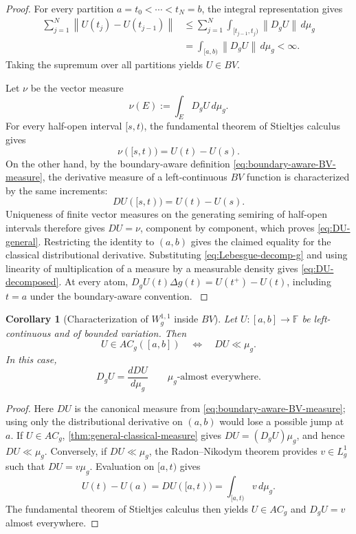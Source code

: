 \documentclass[preprint,12pt]{elsarticle}
\newenvironment{revision}{\begingroup\color{red}}{\endgroup}
\newenvironment{revision}{}{}
\newtheorem{corollary}[theorem]{Corollary}
\theoremstyle{definition}
\theoremstyle{remark}
\newcommand{\F}{\mathbb F}
\newcommand{\norm}[1]{\left\lVert#1\right\rVert}
\begin{document}
\begin{proof}
For every partition $a=t_0<\cdots<t_N=b$, the integral representation gives
\begin{align*}
 \sum_{j=1}^N\norm{U(t_j)-U(t_{j-1})}
 &\le\sum_{j=1}^N\int_{[t_{j-1},t_j)}\norm{D_gU}\,d\mu_g\\
 &=\int_{[a,b)}\norm{D_gU}\,d\mu_g<\infty.
\end{align*}
Taking the supremum over all partitions yields $U\in BV$.

Let $\nu$ be the vector measure
\[
 \nu(E):=\int_E D_gU\,d\mu_g.
\]
For every half-open interval $[s,t)$, the fundamental theorem of Stieltjes calculus gives
\[
 \nu([s,t))=U(t)-U(s).
\]
\begin{revision}
On the other hand, by the boundary-aware definition
\eqref{eq:boundary-aware-BV-measure}, the derivative measure of a
left-continuous \(BV\) function is characterized by the same increments:
\end{revision}
\[
 DU([s,t))=U(t)-U(s).
\]
\begin{revision}
Uniqueness of finite vector measures on the generating semiring of half-open
intervals therefore gives \(DU=\nu\), component by component, which proves
\eqref{eq:DU-general}.  Restricting the identity to \((a,b)\) gives the claimed
equality for the classical distributional derivative.  Substituting
\eqref{eq:Lebesgue-decomp-g} and using linearity of multiplication of a measure
by a measurable density gives \eqref{eq:DU-decomposed}. At every atom,
\(D_gU(t)\Delta g(t)=U(t^+)-U(t)\), including \(t=a\) under the
boundary-aware convention.
\end{revision}
\end{proof}

\begin{corollary}[Characterization of $W_g^{1,1}$ inside $BV$]\label{cor:BV-characterization}
Let $U:[a,b]\to\F$ be left-continuous and of bounded variation. Then
\[
 U\in AC_g([a,b])
 \quad\Longleftrightarrow\quad
 DU\ll\mu_g.
\]
In this case,
\[
 D_gU=\frac{dDU}{d\mu_g}
 \qquad\mu_g\text{-almost everywhere}.
\]
\end{corollary}

\begin{proof}
\begin{revision}
Here \(DU\) is the canonical measure from
\eqref{eq:boundary-aware-BV-measure}; using only the distributional derivative
on \((a,b)\) would lose a possible jump at \(a\).  If \(U\in AC_g\),
\cref{thm:general-classical-measure} gives \(DU=(D_gU)\mu_g\), and hence
\(DU\ll\mu_g\). Conversely, if \(DU\ll\mu_g\), the Radon--Nikodym theorem
provides \(v\in L_g^1\) such that \(DU=v\mu_g\). Evaluation on \([a,t)\)
gives
\end{revision}
\[
 U(t)-U(a)=DU([a,t))=\int_{[a,t)}v\,d\mu_g.
\]
The fundamental theorem of Stieltjes calculus then yields $U\in AC_g$ and $D_gU=v$ almost everywhere.
\end{proof}
\end{document}
